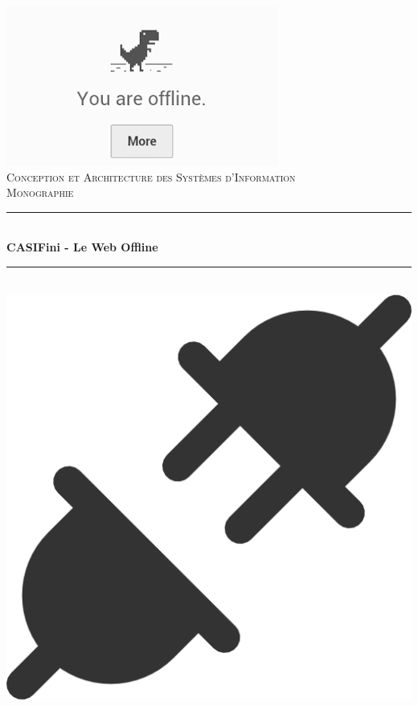 \documentclass[12pt, openany]{report}
\newcommand{\HRule}{\rule{\linewidth}{0.5mm}}
\begin{document}
\begin{titlepage}
  \begin{sffamily}
  \begin{center}

    \includegraphics[scale=0.8]{./images/offlinedinosaru.png}~\\[1.5cm]

    \textsc{\LARGE Conception et Architecture des Systèmes d'Information}\\[2cm]

    \textsc{\Large Monographie}\\[1.5cm]

    \HRule \\[0.4cm]
    { \huge \bfseries CASIFini - Le Web Offline }

    \HRule \\[2cm]
    \includegraphics[scale=0.3]{./images/disconnected.PNG}
    \\[2cm]


\end{center}
\end{sffamily}
\end{titlepage}
\end{document}
